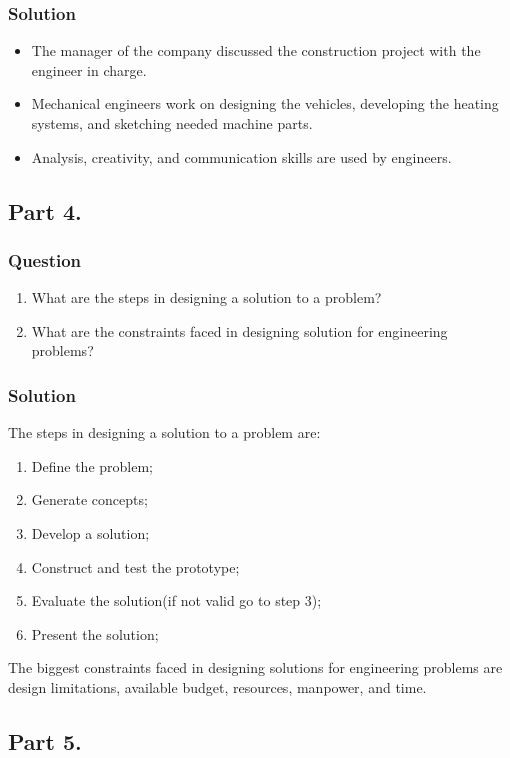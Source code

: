 \documentclass[a4paper, 10pt]{article}
\begin{document}
			\subsubsection{Solution}
				\begin{itemize}
					\item The manager of the company discussed the construction project with the engineer in charge.
					\item Mechanical engineers work on designing the vehicles, developing the heating systems, and sketching needed machine parts.
					\item Analysis, creativity, and communication skills are used by engineers.
				\end{itemize}
	\pagebreak
	\subsection{Part 4.}
		\subsubsection{Question}
			\begin{enumerate}
				\item What are the steps in designing a solution to a problem?
				\item What are the constraints faced in designing solution for engineering problems?
			\end{enumerate}
		\subsubsection{Solution}
			\noindent The steps in designing a solution to a problem are: \vspace{2mm}
			\begin{enumerate}
				\item Define the problem;
				\item Generate concepts;
				\item Develop a solution;
				\item Construct and test the prototype;
				\item Evaluate the solution(if not valid go to step 3);
				\item Present the solution;
			\end{enumerate}
			\vspace{5mm}
			\noindent The biggest constraints faced in designing solutions for engineering problems are design limitations, available budget, resources, manpower, and time.
	\subsection{Part 5.}
\end{document}

